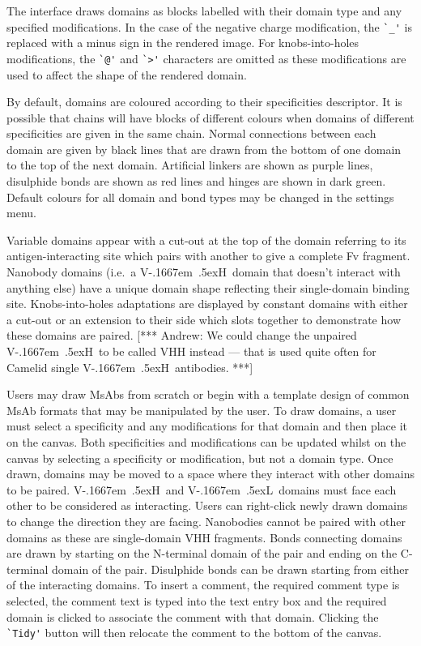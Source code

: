 \documentclass[a4paper]{article}
\newcommand{\VH}{\mbox{V\kern-.1667em \lower.5ex\hbox{\scriptsize H}}}
\newcommand{\VL}{\mbox{V\kern-.1667em \lower.5ex\hbox{\scriptsize L}}}
\newcommand{\andrew}[1]{{\color{red} [*** Andrew: #1 ***]}}
\begin{document}
The interface draws domains as blocks labelled with their domain type
and any specified modifications.  In the case of the negative charge
modification, the \verb|`_'| is replaced with a minus sign in the
rendered image.  For knobs-into-holes modifications, the \verb|`@'|
and \verb|`>'| characters are omitted as these modifications are used
to affect the shape of the rendered domain.

By default, domains are coloured according
to their specificities descriptor. It is possible that chains will
have blocks of different colours when domains of different
specificities are given in the same chain.
Normal connections between each domain are given by black lines that
are drawn from the bottom of one domain to the top of the next
domain. Artificial linkers are shown as purple lines, disulphide bonds
are shown as red lines and hinges are shown in dark green. Default
colours for all domain and bond types 
may be changed in the settings menu.


Variable domains appear
with a cut-out at the top of the domain referring to its
antigen-interacting site which pairs with another to give a complete
Fv fragment. Nanobody domains (i.e.\ a \VH\ domain that doesn't interact with
anything else) have a unique domain shape reflecting their single-domain
binding site. Knobs-into-holes adaptations are displayed by constant
domains with either a cut-out or an extension to their side which
slots together to demonstrate how these domains are paired.
\andrew{We could change the unpaired \VH\ to be called VHH instead ---
  that is used quite often for Camelid single \VH\ antibodies.}

Users may draw MsAbs from scratch or begin with a template design of
common MsAb formats that may be manipulated by the user. To draw
domains, a user must select a specificity and any modifications for that domain
and then place it on the canvas. Both specificities and modifications
can be updated whilst on the canvas by selecting a specificity or
modification, but not a domain type. Once drawn, domains may be
moved to a space where they interact with other domains to be
paired. \VH\ and \VL\ domains must face each other to be considered as
interacting. Users can right-click newly drawn domains to change the
direction they are facing. Nanobodies cannot be paired with other
domains as these are single-domain VHH fragments. Bonds connecting
domains are drawn by starting on the N-terminal domain of the pair and ending on
the C-terminal domain of the pair. Disulphide bonds can be drawn starting from either
of the interacting domains. To insert a comment, the required
comment type is selected, the comment text is typed into the
text entry box and the required domain is clicked to associate the
comment with that domain.  Clicking the \verb|`Tidy'| button will then
relocate the comment to the bottom of the canvas.
\end{document}
